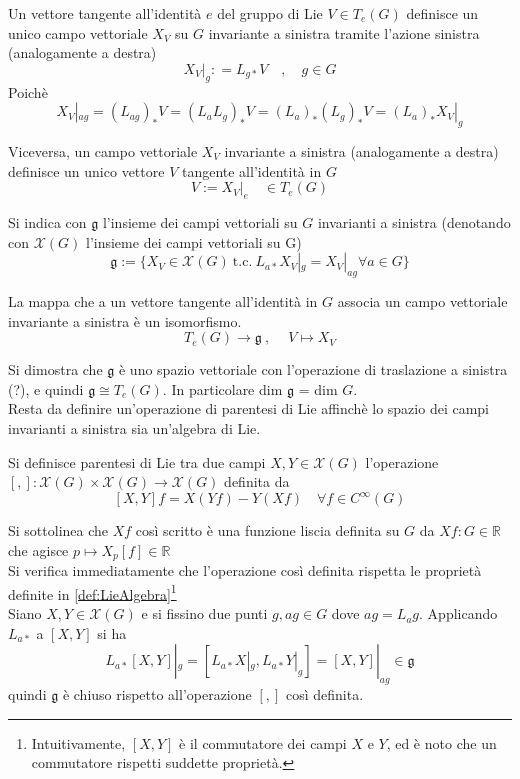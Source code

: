 Un vettore tangente all'identità $e$ del gruppo di Lie $V \in T_e(G)$
definisce un unico campo vettoriale $X_V$ su $G$ invariante a sinistra tramite
l'azione sinistra (analogamente a destra)
$$
   X_V|_g : = L_{g*} V \quad , \quad g \in G
$$
Poichè
$$
   X_V|_{ag} = (L_{ag})_* V = (L_a L_g)_* V = (L_a)_*(L_g)_* V = (L_a)_* X_V|_g
$$

Viceversa, un campo vettoriale $X_V$ invariante a sinistra (analogamente a destra)
definisce un unico vettore $V$ tangente all'identità in $G$
$$
   V := X_V|_e \quad \in T_e(G)
$$
\begin{definition}\label{def:GroupLieLlgebra}
  Si indica con $\mathfrak{g}$ l'insieme dei campi vettoriali su $G$ invarianti
  a sinistra (denotando con $\mathcal{X}(G)$ l'insieme dei campi vettoriali su G)
  $$
    \mathfrak{g} := \{ X_V \in \mathcal{X}(G) \mathrm{\: t.c. \:}
       L_{a*}X_V|_g = X_V|_{ag} \forall a \in G \}
  $$
\end{definition}
La mappa che a un vettore tangente all'identità in $G$ associa un campo vettoriale
invariante a sinistra è un isomorfismo.
$$
   T_e(G) \to \mathfrak{g} \:,\: \quad V \mapsto X_V
$$

Si dimostra che $\mathfrak{g}$ è uno spazio vettoriale con l'operazione di
traslazione a sinistra (?), e quindi $\mathfrak{g} \cong T_e(G)$.
In particolare dim $\mathfrak{g}$ = dim $G$.\\

Resta da definire un'operazione di parentesi di Lie affinchè lo spazio dei campi
invarianti a sinistra sia un'algebra di Lie.\\
\begin{definition}\label{def:parentesiLie}
   Si definisce parentesi di Lie tra due campi $X,Y \in \mathcal{X}(G)$ l'operazione
   $[,] : \mathcal{X}(G) \times \mathcal{X}(G) \to \mathcal{X}(G)$ definita da
   $$
      [X,Y]f = X(Yf) - Y(Xf) \quad \forall f \in C^\infty(G)
   $$
\end{definition}
Si sottolinea che $Xf$ così scritto è una funzione liscia definita su $G$ da
$Xf : G \in \mathbb{R}$ che agisce $p \mapsto X_p[f]\in \mathbb{R}$\\

Si verifica immediatamente che l'operazione così definita rispetta le proprietà
definite in \ref{def:LieAlgebra}\footnote{Intuitivamente, $[X,Y]$ è il commutatore
dei campi $X$ e $Y$, ed è noto che un commutatore rispetti suddette proprietà.}\\

Siano $X,Y \in \mathcal{X}(G)$ e si fissino due punti $g, ag \in G$ dove
$ag = L_a g$. Applicando $L_{a*}$ a $[X,Y]$ si ha
$$
   L_{a*}[X,Y]|_g = [L_{a*}X|_g,L_{a*}Y|_g] = [X,Y]|_{ag} \in \mathfrak{g}
$$
quindi $\mathfrak{g}$ è chiuso rispetto all'operazione $[,]$ così definita.\\

